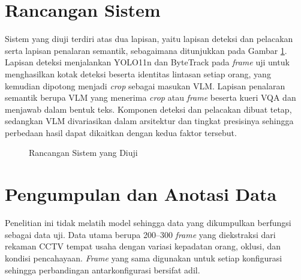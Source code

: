 \section{Rancangan Sistem}
Sistem yang diuji terdiri atas dua lapisan, yaitu lapisan deteksi dan pelacakan serta lapisan penalaran semantik, sebagaimana ditunjukkan pada Gambar \ref{fig:arsitektur}. Lapisan deteksi menjalankan YOLO11n dan ByteTrack pada \textit{frame} uji untuk menghasilkan kotak deteksi beserta identitas lintasan setiap orang, yang kemudian dipotong menjadi \textit{crop} sebagai masukan VLM. Lapisan penalaran semantik berupa VLM yang menerima \textit{crop} atau \textit{frame} beserta kueri VQA dan menjawab dalam bentuk teks. Komponen deteksi dan pelacakan dibuat tetap, sedangkan VLM divariasikan dalam arsitektur dan tingkat presisinya sehingga perbedaan hasil dapat dikaitkan dengan kedua faktor tersebut.

\begin{figure}[htbp]
    \centering
    \caption{Rancangan Sistem yang Diuji}
    \label{fig:arsitektur}
\end{figure}

\section{Pengumpulan dan Anotasi Data}
Penelitian ini tidak melatih model sehingga data yang dikumpulkan berfungsi sebagai data uji. Data utama berupa 200--300 \textit{frame} yang diekstraksi dari rekaman CCTV tempat usaha dengan variasi kepadatan orang, oklusi, dan kondisi pencahayaan. \textit{Frame} yang sama digunakan untuk setiap konfigurasi sehingga perbandingan antarkonfigurasi bersifat adil.

